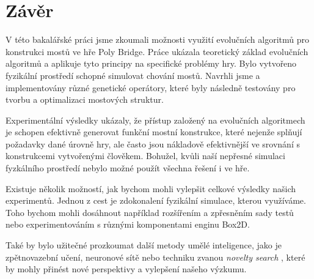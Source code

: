 \chapter{Závěr}



V této bakalářské práci jsme zkoumali možnosti využití evolučních algoritmů pro konstrukci mostů ve hře Poly Bridge. Práce ukázala teoretický základ evolučních algoritmů a aplikuje tyto principy na specifické problémy hry. Bylo vytvořeno fyzikální prostředí schopné simulovat chování mostů. Navrhli jsme a implementovány různé genetické operátory, které byly následně testovány pro tvorbu a optimalizaci mostových struktur.

Experimentální výsledky ukázaly, že přístup založený na evolučních algoritmech je schopen efektivně generovat funkční mostní konstrukce, které nejenže splňují požadavky dané úrovně hry, ale často jsou nákladově efektivnější ve srovnání s konstrukcemi vytvořenými člověkem. Bohužel, kvůli naší nepřesné simulaci fyzkálního prostředí nebylo možné použít všechna řešení i ve hře.

Existuje několik možností, jak bychom mohli vylepšit celkové výsledky našich experimentů. Jednou z cest je zdokonalení fyzikální simulace, kterou využíváme. Toho bychom mohli dosáhnout například rozšířením a zpřesněním sady testů nebo experimentováním s různými komponentami enginu Box2D.

Také by bylo užitečné prozkoumat další metody umělé inteligence, jako je zpětnovazební učení, neuronové sítě nebo techniku zvanou \emph{novelty search} \cite{lehman2011}, které by mohly přinést nové perspektivy a vylepšení našeho výzkumu. 

